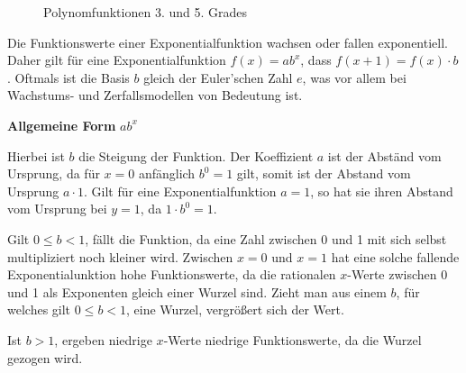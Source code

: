 \begin{figure}[t!]
\centering
\caption*{Polynomfunktionen 3. und 5. Grades}
\end{figure}

\pagebreak


Die Funktionswerte einer Exponentialfunktion wachsen oder fallen exponentiell. Daher gilt f\"{u}r eine Exponentialfunktion $f(x) = ab^x$, dass $f(x + 1) = f(x) \cdot b$. Oftmals ist die Basis $b$ gleich der Euler'schen Zahl $e$, was vor allem bei Wachstums- und Zerfallsmodellen von Bedeutung ist.

\textbf{Allgemeine Form}  $ab^x$

Hierbei ist $b$ die Steigung der Funktion. Der Koeffizient $a$ ist der Abst\"{a}nd vom Ursprung, da f\"{u}r $x = 0$ anf\"{a}nglich $b^0 = 1$ gilt, somit ist der Abstand vom Ursprung $a \cdot 1$. Gilt f\"{u}r eine Exponentialfunktion $a = 1$, so hat sie ihren Abstand vom Ursprung bei $y =1$, da $1 \cdot b^0 = 1$.

Gilt $0 \leq b < 1$, f\"{a}llt die Funktion, da eine Zahl zwischen 0 und 1 mit sich selbst multipliziert noch kleiner wird. Zwischen $x = 0$ und $x = 1$ hat eine solche fallende Exponentialunktion hohe Funktionswerte, da die rationalen $x$-Werte zwischen 0 und 1 als Exponenten gleich einer Wurzel sind. Zieht man aus einem $b$, f\"{u}r welches gilt $0 \leq b < 1$, eine Wurzel, vergr\"{o}\ss{}ert sich der Wert.

Ist $b > 1$, ergeben niedrige $x$-Werte niedrige Funktionswerte, da die Wurzel gezogen wird.

